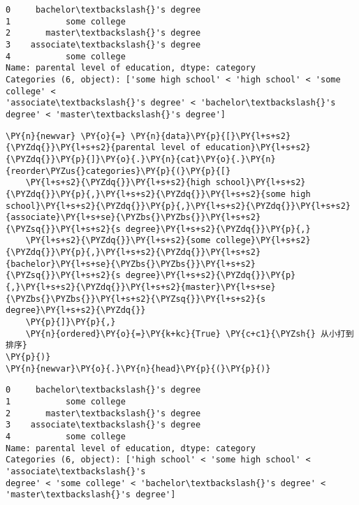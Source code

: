             \begin{tcolorbox}[breakable, size=fbox, boxrule=.5pt, pad at break*=1mm, opacityfill=0]
\begin{Verbatim}[commandchars=\\\{\}]
0     bachelor\textbackslash{}'s degree
1           some college
2       master\textbackslash{}'s degree
3    associate\textbackslash{}'s degree
4           some college
Name: parental level of education, dtype: category
Categories (6, object): ['some high school' < 'high school' < 'some college' <
'associate\textbackslash{}'s degree' < 'bachelor\textbackslash{}'s degree' < 'master\textbackslash{}'s degree']
\end{Verbatim}
\end{tcolorbox}
        
    \begin{tcolorbox}[breakable, size=fbox, boxrule=1pt, pad at break*=1mm,colback=cellbackground, colframe=cellborder]
\begin{Verbatim}[commandchars=\\\{\}]
\PY{n}{newvar} \PY{o}{=} \PY{n}{data}\PY{p}{[}\PY{l+s+s2}{\PYZdq{}}\PY{l+s+s2}{parental level of education}\PY{l+s+s2}{\PYZdq{}}\PY{p}{]}\PY{o}{.}\PY{n}{cat}\PY{o}{.}\PY{n}{reorder\PYZus{}categories}\PY{p}{(}\PY{p}{[}
    \PY{l+s+s2}{\PYZdq{}}\PY{l+s+s2}{high school}\PY{l+s+s2}{\PYZdq{}}\PY{p}{,}\PY{l+s+s2}{\PYZdq{}}\PY{l+s+s2}{some high school}\PY{l+s+s2}{\PYZdq{}}\PY{p}{,}\PY{l+s+s2}{\PYZdq{}}\PY{l+s+s2}{associate}\PY{l+s+se}{\PYZbs{}\PYZbs{}}\PY{l+s+s2}{\PYZsq{}}\PY{l+s+s2}{s degree}\PY{l+s+s2}{\PYZdq{}}\PY{p}{,}
    \PY{l+s+s2}{\PYZdq{}}\PY{l+s+s2}{some college}\PY{l+s+s2}{\PYZdq{}}\PY{p}{,}\PY{l+s+s2}{\PYZdq{}}\PY{l+s+s2}{bachelor}\PY{l+s+se}{\PYZbs{}\PYZbs{}}\PY{l+s+s2}{\PYZsq{}}\PY{l+s+s2}{s degree}\PY{l+s+s2}{\PYZdq{}}\PY{p}{,}\PY{l+s+s2}{\PYZdq{}}\PY{l+s+s2}{master}\PY{l+s+se}{\PYZbs{}\PYZbs{}}\PY{l+s+s2}{\PYZsq{}}\PY{l+s+s2}{s degree}\PY{l+s+s2}{\PYZdq{}}
    \PY{p}{]}\PY{p}{,}
    \PY{n}{ordered}\PY{o}{=}\PY{k+kc}{True} \PY{c+c1}{\PYZsh{} 从小打到排序}
\PY{p}{)}
\PY{n}{newvar}\PY{o}{.}\PY{n}{head}\PY{p}{(}\PY{p}{)}
\end{Verbatim}
\end{tcolorbox}

            \begin{tcolorbox}[breakable, size=fbox, boxrule=.5pt, pad at break*=1mm, opacityfill=0]
\begin{Verbatim}[commandchars=\\\{\}]
0     bachelor\textbackslash{}'s degree
1           some college
2       master\textbackslash{}'s degree
3    associate\textbackslash{}'s degree
4           some college
Name: parental level of education, dtype: category
Categories (6, object): ['high school' < 'some high school' < 'associate\textbackslash{}'s
degree' < 'some college' < 'bachelor\textbackslash{}'s degree' < 'master\textbackslash{}'s degree']
\end{Verbatim}
\end{tcolorbox}